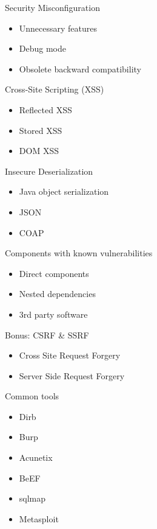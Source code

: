\documentclass{curs}
\begin{document}
\begin{frame}{Security Misconfiguration}
  \begin{itemize}
    \item Unnecessary features
    \item Debug mode
    \item Obsolete backward compatibility
  \end{itemize}
\end{frame}

\begin{frame}{Cross-Site Scripting (XSS)}
  \begin{itemize}
    \item Reflected XSS
    \item Stored XSS
    \item DOM XSS
  \end{itemize}
\end{frame}

\begin{frame}{Insecure Deserialization}
  \begin{itemize}
    \item Java object serialization
    \item JSON
    \item COAP
  \end{itemize}
\end{frame}

\begin{frame}{Components with known vulnerabilities}
  \begin{itemize}
    \item Direct components
    \item Nested dependencies
    \item 3rd party software
  \end{itemize}
\end{frame}

\begin{frame}{Bonus: CSRF \& SSRF}
  \begin{itemize}
    \item Cross Site Request Forgery
    \item Server Side Request Forgery
  \end{itemize}
\end{frame}

\begin{frame}{Common tools}
  \begin{itemize}
    \item Dirb
    \item Burp
    \item Acunetix
    \item BeEF
    \item sqlmap
    \item Metasploit
  \end{itemize}
\end{frame}
\end{document}

